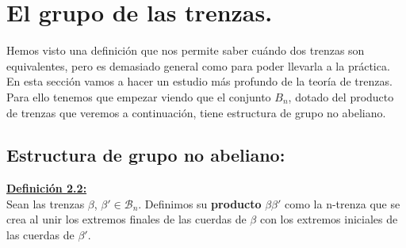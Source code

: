 \section{El grupo de las trenzas.}\label{grupotrenzas}
Hemos visto una definición que nos permite saber cuándo dos trenzas son equivalentes, pero es demasiado general como para poder llevarla a la práctica. En esta sección vamos a hacer un estudio más profundo de la teoría de trenzas. Para ello tenemos que empezar viendo que el conjunto ${B}_{n}$, dotado del producto de trenzas que veremos a continuación, tiene estructura de grupo no abeliano.

\begin{center}
     \subsection{Estructura de grupo no abeliano:}
\end{center}

\textbf{\underline{Definición 2.2:}}\label{defpro}\\
Sean las trenzas $\beta$, $\beta' \in \mathscr{B}_{n}$. Definimos su \textbf{producto} $\beta \beta'$ como la n-trenza que se crea al unir los extremos finales de las cuerdas de $\beta$ con los extremos iniciales de las cuerdas de $\beta'$.\\

